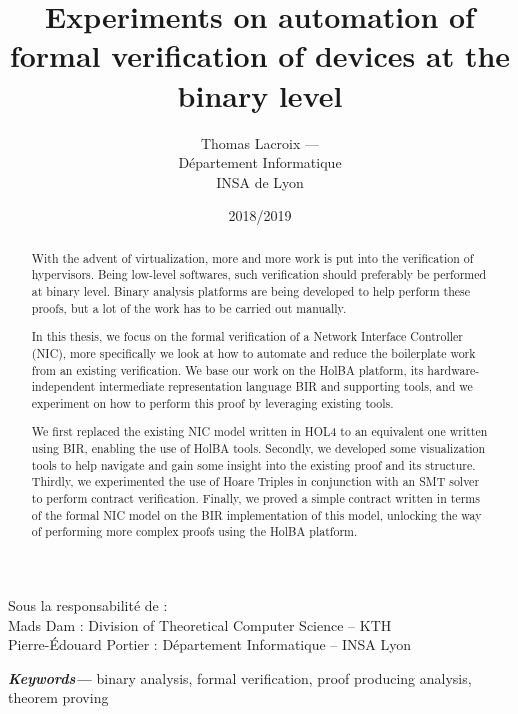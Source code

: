 \documentclass[10pt,a4paper]{article}
\title{Experiments on automation of formal verification of devices at the binary level}
\author{Thomas Lacroix --- \email{thomas.lacroix@insa-lyon.fr}\medskip\\
Département Informatique\\
INSA de Lyon}
\date{2018/2019}
\begin{document}

\maketitle
\thispagestyle{empty}

{
\noindent Sous la responsabilité de :\\
\indent Mads Dam : Division of Theoretical Computer Science -- KTH\\
\indent Pierre-\'Edouard Portier : Département Informatique -- INSA Lyon
}

\vspace{\baselineskip}\vspace{\baselineskip}

{ %
\fontsize{9}{10.8}

\begin{abstract}
  \rightmargin=1cm \leftmargin=1cm
  With the advent of virtualization, more and more work is put into the verification of hypervisors. Being low-level softwares, such verification should preferably be performed at binary level. Binary analysis platforms are being developed to help perform these proofs, but a lot of the work has to be carried out manually.

  In this thesis, we focus on the formal verification of a Network Interface Controller (NIC), more specifically we look at how to automate and reduce the boilerplate work from an existing verification. We base our work on the HolBA platform, its hardware-independent intermediate representation language BIR and supporting tools, and we experiment on how to perform this proof by leveraging existing tools.

  We first replaced the existing NIC model written in HOL4 to an equivalent one written using BIR, enabling the use of HolBA tools. Secondly, we developed some visualization tools to help navigate and gain some insight into the existing proof and its structure. Thirdly, we experimented the use of Hoare Triples in conjunction with an SMT solver to perform contract verification. Finally, we proved a simple contract written in terms of the formal NIC model on the BIR implementation of this model, unlocking the way of performing more complex proofs using the HolBA platform.
\end{abstract}

\leftmargin=1cm
{\small\textbf{\textit{Keywords---}} binary analysis, formal verification, proof producing analysis, theorem proving}

}
\end{document}
